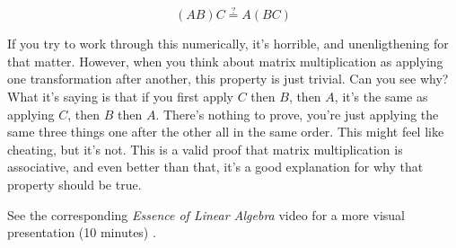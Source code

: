 \begin{equation*}
  (AB)C \stackrel{?}{=} A(BC)
\end{equation*}

If you try to work through this numerically, it's horrible, and unenligthening
for that matter. However, when you think about matrix multiplication as applying
one transformation after another, this property is just trivial. Can you see
why? What it's saying is that if you first apply $C$ then $B$, then $A$, it's
the same as applying $C$, then $B$ then $A$. There's nothing to prove, you're
just applying the same three things one after the other all in the same order.
This might feel like cheating, but it's not. This is a valid proof that matrix
multiplication is associative, and even better than that, it's a good
explanation for why that property should be true.

\begin{remark}
  See the corresponding \textit{Essence of Linear Algebra} video for a more
  visual presentation (10 minutes)
  \cite{bib:linalg_matrix_multiplication_as_composition}.
\end{remark}
